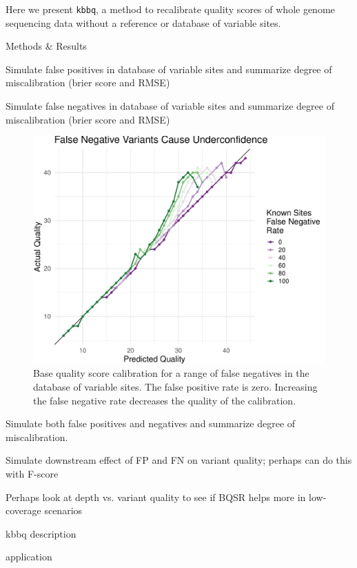 \documentclass{article}
\begin{document}
\begin{outline}
\begin{outline}
		\item Here we present \texttt{kbbq}, a method to recalibrate quality scores of whole genome sequencing data without a reference or database of variable sites.
	\end{outline}
	\item Methods \& Results
	\begin{outline}
		\item Simulate false positives in database of variable sites and summarize degree of miscalibration (brier score and RMSE)
		\item Simulate false negatives in database of variable sites and summarize degree of miscalibration (brier score and RMSE)
		\begin{figure}[h]
			\includegraphics[width=5in]{./figures/fnr.pdf}
			\caption{Base quality score calibration for a range of false negatives in the database of variable sites. The false positive rate is zero. Increasing the false negative rate decreases the quality of the calibration.}
		\end{figure}	
		\item Simulate both false positives and negatives and summarize degree of miscalibration.
		\item Simulate downstream effect of FP and FN on variant quality; perhaps can do this with F-score
		\item Perhaps look at depth vs. variant quality to see if BQSR helps more in low-coverage scenarios
		\item kbbq description
		\item application
	\end{outline}

\end{outline}
\end{document}
